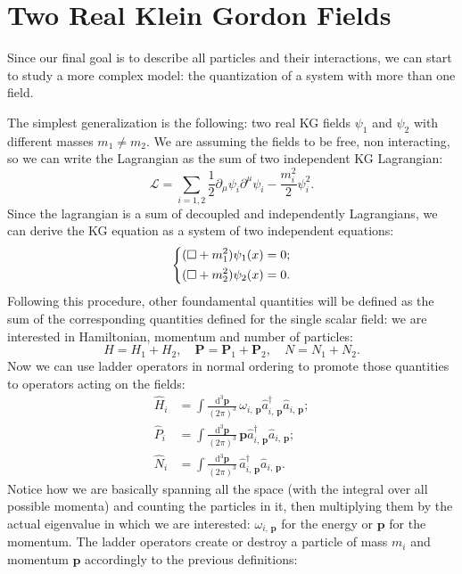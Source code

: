 \section{Two Real Klein Gordon Fields}\label{sec:two_real_KG_fields}

Since our final goal is to describe all particles and their interactions, we can start to study a more complex model: the quantization of a system with more than one field.

The simplest generalization is the following: two real KG fields \(\psi_1\) and \(\psi_2\) with different masses \(m_1 \neq m_2\). We are assuming the fields to be free, non interacting, so we can write the Lagrangian as the sum of two independent KG Lagrangian:
\begin{equation}
    \mathcal{L} = \sum_{i=1,2} \frac{1}{2}\partial_\mu \psi_i \partial^{\mu} \psi_i - \frac{m_i^2}{2}\psi_i^2.
    \label{eq:KG_lagrangian_two_fields}
\end{equation}
Since the lagrangian is a sum of decoupled and independently Lagrangians, we can derive the KG equation as a system of two independent equations:
\[
    \begin{dcases}
        (\Box + m_1^2) \psi_1(x) = 0; \\
        (\Box + m_2^2) \psi_2(x) = 0. \\
    \end{dcases}
\]
Following this procedure, other foundamental quantities will be defined as the sum of the corresponding quantities defined for the single scalar field: we are interested in Hamiltonian, momentum and number of particles:
\[
    H = H_1 + H_2, \quad \mathbf{P} = \mathbf{P}_1 + \mathbf{P}_2, \quad N = N_1 + N_2.
\]
Now we can use ladder operators in normal ordering to promote those quantities to operators acting on the fields:
\[
    \begin{aligned}
        \hat{H}_i & = \int \frac{\mathrm{d}^3 \mathbf{p}}{(2\pi)^3}\, \omega_{i,\,\mathbf{p}} \hat{a}^{\dagger}_{i,\,\mathbf{p}}\hat{a}_{i,\,\mathbf{p}}; \\
        \hat{P}_i & = \int \frac{\mathrm{d}^3 \mathbf{p}}{(2\pi)^3}\, \mathbf{p} \hat{a}^{\dagger}_{i,\,\mathbf{p}}\hat{a}_{i,\,\mathbf{p}};              \\
        \hat{N}_i & = \int \frac{\mathrm{d}^3 \mathbf{p}}{(2\pi)^3}\, \hat{a}^{\dagger}_{i,\,\mathbf{p}}\hat{a}_{i,\,\mathbf{p}}.
    \end{aligned}
\]
Notice how we are basically spanning all the space (with the integral over all possible momenta) and counting the particles in it, then multiplying them by the actual eigenvalue in which we are interested: \(\omega_{i,\,\mathbf{p}}\) for the energy or \(\mathbf{p}\) for the momentum. The ladder operators create or destroy a particle of mass \(m_i\) and momentum \(\mathbf{p}\) accordingly to the previous definitions:
